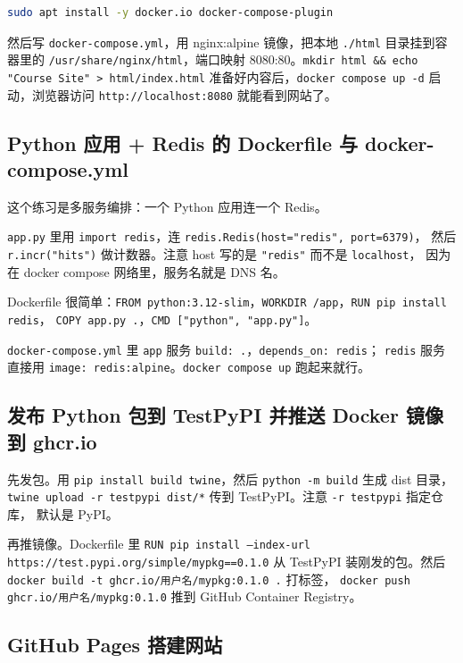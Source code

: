 \documentclass[a4paper,11pt]{ctexart}
\begin{document}
\begin{lstlisting}[language=bash]
sudo apt install -y docker.io docker-compose-plugin
\end{lstlisting}

然后写 \texttt{docker-compose.yml}，用 nginx:alpine 镜像，把本地 \texttt{./html} 目录挂到容器里的
\texttt{/usr/share/nginx/html}，端口映射 8080:80。\texttt{mkdir html \&\& echo "Course Site" > html/index.html}
准备好内容后，\texttt{docker compose up -d} 启动，浏览器访问 \texttt{http://localhost:8080} 就能看到网站了。

\subsection{Python 应用 + Redis 的 Dockerfile 与 docker-compose.yml}

这个练习是多服务编排：一个 Python 应用连一个 Redis。

\texttt{app.py} 里用 \texttt{import redis}，连 \texttt{redis.Redis(host="redis", port=6379)}，
然后 \texttt{r.incr("hits")} 做计数器。注意 host 写的是 \texttt{"redis"} 而不是 \texttt{localhost}，
因为在 docker compose 网络里，服务名就是 DNS 名。

Dockerfile 很简单：\texttt{FROM python:3.12-slim}，\texttt{WORKDIR /app}，\texttt{RUN pip install redis}，
\texttt{COPY app.py .}，\texttt{CMD ["python", "app.py"]}。

\texttt{docker-compose.yml} 里 \texttt{app} 服务 \texttt{build: .}，\texttt{depends\_on: redis}；
\texttt{redis} 服务直接用 \texttt{image: redis:alpine}。\texttt{docker compose up} 跑起来就行。

\subsection{发布 Python 包到 TestPyPI 并推送 Docker 镜像到 ghcr.io}

先发包。用 \texttt{pip install build twine}，然后 \texttt{python -m build} 生成 dist 目录，
\texttt{twine upload -r testpypi dist/*} 传到 TestPyPI。注意 \texttt{-r testpypi} 指定仓库，
默认是 PyPI。

再推镜像。Dockerfile 里 \texttt{RUN pip install --index-url https://test.pypi.org/simple/mypkg==0.1.0}
从 TestPyPI 装刚发的包。然后 \texttt{docker build -t ghcr.io/用户名/mypkg:0.1.0 .} 打标签，
\texttt{docker push ghcr.io/用户名/mypkg:0.1.0} 推到 GitHub Container Registry。

\subsection{GitHub Pages 搭建网站}
\end{document}
